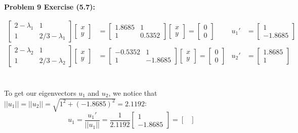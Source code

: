 \documentclass[11pt]{article}
\newenvironment{problem}[1]{\textbf{Problem #1: }}{\newpage}
\begin{document}
\begin{problem}{9 Exercise (5.7)}
\begin{enumerate}[label = (\alph*)]
\begin{align*}
\begin{bmatrix}
					2 - \lambda_1 & 1 \\
					1 & 2/3 - \lambda_1
				\end{bmatrix}\begin{bmatrix}
					x \\ y
				\end{bmatrix} &=  
				\begin{bmatrix}
					1.8685 & 1 \\
					1 & 0.5352
				\end{bmatrix}\begin{bmatrix}
					x \\ y
				\end{bmatrix} = \begin{bmatrix}
					0 \\ 0
				\end{bmatrix} & u_1' &= \begin{bmatrix}
					1 \\ -1.8685
				\end{bmatrix}
				\\ 
				\begin{bmatrix}
					2 - \lambda_2 & 1 \\
					1 & 2/3 - \lambda_2
				\end{bmatrix}\begin{bmatrix}
					x \\ y
				\end{bmatrix} &=  
				\begin{bmatrix}
					-0.5352 & 1 \\
					1 & -1.8685
				\end{bmatrix}\begin{bmatrix}
					x \\ y
				\end{bmatrix} = \begin{bmatrix}
					0 \\ 0
				\end{bmatrix} & u_2' &= \begin{bmatrix}
					1.8685 \\ 1
				\end{bmatrix}
			\end{align*}
			\\ \\
			To get our eigenvectors $u_1$ and $u_2$, we notice that $||u_1|| = ||u_2|| = \sqrt{1^2 + (-1.8685)^2} = 2.1192$:
			\[u_1 = \frac{u_1'}{||u_1||} = \frac{1}{2.1192}\begin{bmatrix}
				1 \\ -1.8685
			\end{bmatrix} = \boldsymbol{\begin{bmatrix}

\end{bmatrix}}\]
\end{enumerate}
\end{problem}
\end{document}
